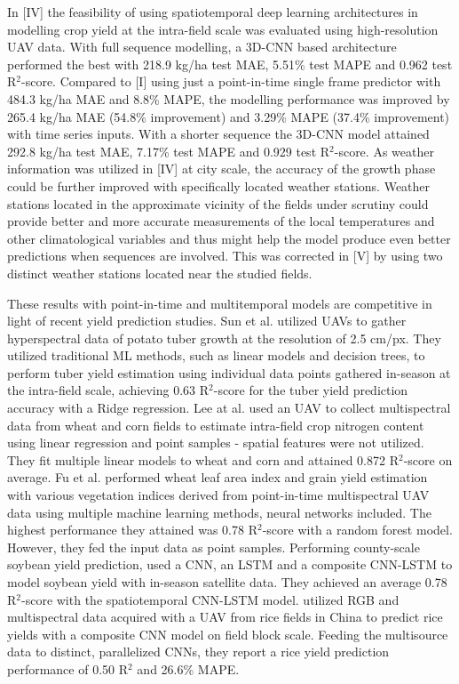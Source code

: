 In [IV] the feasibility of using spatiotemporal deep learning architectures in modelling crop yield at the intra-field scale was evaluated using high-resolution UAV data. With full sequence modelling, a 3D-CNN based architecture performed the best with 218.9 kg/ha test MAE, 5.51\% test MAPE and 0.962 test R$^2$-score. Compared to [I] using just a point-in-time single frame predictor with 484.3 kg/ha MAE and 8.8\% MAPE, the modelling performance was improved by 265.4 kg/ha MAE (54.8\% improvement) and 3.29\% MAPE (37.4\% improvement) with time series inputs. With a shorter sequence the 3D-CNN model attained 292.8 kg/ha test MAE, 7.17\% test MAPE and 0.929 test R$^2$-score. As weather information was utilized in [IV] at city scale, the accuracy of the growth phase could be further improved with specifically located weather stations. Weather stations located in the approximate vicinity of the fields under scrutiny could provide better and more accurate measurements of the local temperatures and other climatological variables and thus might help the model produce even better predictions when sequences are involved. This was corrected in [V] by using two distinct weather stations located near the studied fields.

These results with point-in-time and multitemporal models are competitive in light of recent yield prediction studies. Sun et al. \cite{Sun2020} utilized UAVs to gather hyperspectral data of potato tuber growth at the resolution of 2.5 cm/px. They utilized traditional ML methods, such as linear models and decision trees, to perform tuber yield estimation using individual data points gathered in-season at the intra-field scale, achieving 0.63 R$^2$-score for the tuber yield prediction accuracy with a Ridge regression. Lee at al. \cite{Lee2020} used an UAV to collect multispectral data from wheat and corn fields to estimate intra-field crop nitrogen content using linear regression and point samples - spatial features were not utilized. They fit multiple linear models to wheat and corn and attained 0.872 R$^2$-score on average. Fu et al. \cite{Fu2020} performed wheat leaf area index and grain yield estimation with various vegetation indices derived from point-in-time multispectral UAV data using multiple machine learning methods, neural networks included. The highest performance they attained was 0.78 R$^2$-score with a random forest model. However, they fed the input data as point samples. Performing county-scale soybean yield prediction, \cite{Sun2019} used a CNN, an LSTM and a composite CNN-LSTM to model soybean yield with in-season satellite data. They achieved an average 0.78 R$^2$-score with the spatiotemporal CNN-LSTM model. \cite{Yang2019} utilized RGB and multispectral data acquired with a UAV from rice fields in China to predict rice yields with a composite CNN model on field block scale. Feeding the multisource data to distinct, parallelized CNNs, they report a rice yield prediction performance of 0.50 R$^2$ and 26.6\% MAPE.

